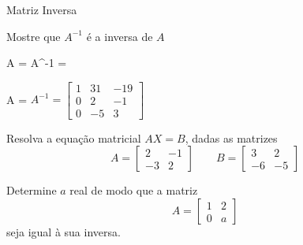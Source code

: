 \begin{exercicios}{Matriz Inversa}
        
    \begin{exercicio}
        Mostre que $A^{-1}$ é a inversa de $A$
        \begin{mathlist}
            \item A = \left[\begin{array}{cc}
                     1 & 3 \\
                     2 & 7
                 \end{array} \right] 
                 \quad
                 A^{-1} = \left[\begin{array}{cc}
                     7  & -3 \\
                     -2 & 1
                 \end{array} \right]
            \item A =  \)
                  \( A^{-1} = \left[ \begin{array}{rrr}
                                            1 & 31 & -19 \\
                                            0 &  2 &  -1 \\
                                            0 & -5 &   3
                                        \end{array} \right] \)
        \end{mathlist}
    \end{exercicio}

    \begin{exercicio}
        Resolva a equação  matricial $AX = B$, dadas as matrizes
        \[A = \left[\begin{array}{rr}
             2 & -1 \\
            -3 &  2
        \end{array} \right]    
        \qquad
        B = \left[\begin{array}{rr}
             3 &  2 \\
            -6 & -5
        \end{array} \right]    \]
    \end{exercicio}

    \begin{exercicio}
        Determine $a$ real de modo que a matriz 
        \[A = \left[\begin{array}{cc}
            1 & 2 \\
            0 & a
        \end{array} \right]\]
        seja igual à sua inversa.
    \end{exercicio}
    
\end{exercicios} %

